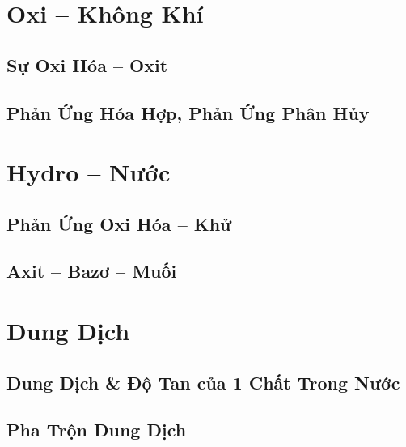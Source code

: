 \documentclass{article}
\numberwithin{equation}{section}
\begin{document}
\section{Oxi -- Không Khí}

\subsection{Sự Oxi Hóa -- Oxit}


\subsection{Phản Ứng Hóa Hợp, Phản Ứng Phân Hủy}


\section{Hydro -- Nước}

\subsection{Phản Ứng Oxi Hóa -- Khử}


\subsection{Axit -- Bazơ -- Muối}


\section{Dung Dịch}

\subsection{Dung Dịch \& Độ Tan của 1 Chất Trong Nước}


\subsection{Pha Trộn Dung Dịch}
\end{document}
